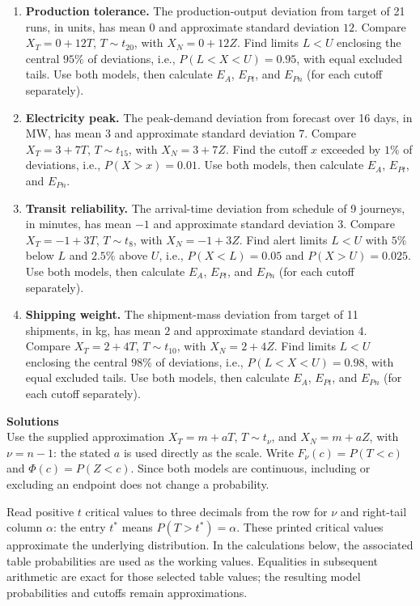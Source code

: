 \begin{enumerate}[leftmargin=*,label=\textbf{\arabic*.},itemsep=5pt,parsep=0pt,topsep=2pt]
		\item \textbf{Production tolerance.} The production-output deviation from target of 21 runs, in units, has mean $0$ and approximate standard deviation $12$. Compare $X_T=0+12T$, $T\sim t_{20}$, with $X_N=0+12Z$. Find limits $L<U$ enclosing the central $95\%$ of deviations, i.e., $P(L<X<U)=0.95$, with equal excluded tails. Use both models, then calculate $E_A$, $E_{Pt}$, and $E_{Pn}$ (for each cutoff separately).
		\item \textbf{Electricity peak.} The peak-demand deviation from forecast over 16 days, in MW, has mean $3$ and approximate standard deviation $7$. Compare $X_T=3+7T$, $T\sim t_{15}$, with $X_N=3+7Z$. Find the cutoff $x$ exceeded by $1\%$ of deviations, i.e., $P(X>x)=0.01$. Use both models, then calculate $E_A$, $E_{Pt}$, and $E_{Pn}$.
		\item \textbf{Transit reliability.} The arrival-time deviation from schedule of 9 journeys, in minutes, has mean $-1$ and approximate standard deviation $3$. Compare $X_T=-1+3T$, $T\sim t_{8}$, with $X_N=-1+3Z$. Find alert limits $L<U$ with $5\%$ below $L$ and $2.5\%$ above $U$, i.e., $P(X<L)=0.05$ and $P(X>U)=0.025$. Use both models, then calculate $E_A$, $E_{Pt}$, and $E_{Pn}$ (for each cutoff separately).
		\item \textbf{Shipping weight.} The shipment-mass deviation from target of 11 shipments, in kg, has mean $2$ and approximate standard deviation $4$. Compare $X_T=2+4T$, $T\sim t_{10}$, with $X_N=2+4Z$. Find limits $L<U$ enclosing the central $98\%$ of deviations, i.e., $P(L<X<U)=0.98$, with equal excluded tails. Use both models, then calculate $E_A$, $E_{Pt}$, and $E_{Pn}$ (for each cutoff separately).
	\end{enumerate}
	
	\textbf{\large Solutions}\\
Use the supplied approximation $X_T=m+aT$, $T\sim t_\nu$, and $X_N=m+aZ$, with $\nu=n-1$: the stated $a$ is used directly as the scale. Write $F_\nu(c)=P(T<c)$ and $\Phi(c)=P(Z<c)$. Since both models are continuous, including or excluding an endpoint does not change a probability.

Read positive $t$ critical values to three decimals from the row for $\nu$ and right-tail column $\alpha$: the entry $t^*$ means $P(T>t^*)=\alpha$. These printed critical values approximate the underlying distribution. In the calculations below, the associated table probabilities are used as the working values. Equalities in subsequent arithmetic are exact for those selected table values; the resulting model probabilities and cutoffs remain approximations.

